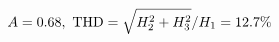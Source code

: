 \documentclass[preview]{standalone}
\begin{document}
\begin{align*}
\special{dvisvgm:raw <g id='unique000'>}A=0.68,\ \text{THD}=\sqrt{H_2^2+H_3^2}/H_1=12.7\%\special{dvisvgm:raw </g>}
\end{align*}
\end{document}

